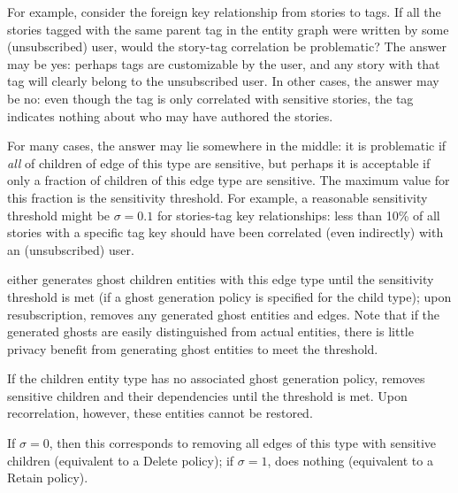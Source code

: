 \begin{itemize}
        For example, consider the foreign key relationship from stories to tags. If all
        the stories tagged with the same parent tag in the entity graph were written by some
        (unsubscribed) user, would the story-tag correlation be problematic? The answer may be yes: 
        perhaps tags are customizable by the user, and any story with that tag will clearly
        belong to the unsubscribed user. In other cases, the answer may be no: even though the tag is only
        correlated with sensitive stories, the tag indicates nothing about who may have authored the stories.

        For many cases, the answer may lie somewhere in the middle: it is problematic if \emph{all} of
        children of edge of this type are sensitive, but perhaps it is acceptable if only a fraction of
        children of this edge type are sensitive. The maximum value for this fraction is the sensitivity threshold.
        For example, a reasonable sensitivity threshold might be $\sigma = 0.1$ for stories-tag key relationships:
        less than 10\% of all stories with a specific tag key should have been correlated (even
        indirectly) with an (unsubscribed) user. 

        \sys{} either generates ghost children entities with this edge type until the
        sensitivity threshold is met (if a ghost generation policy is specified for the child type); upon
        resubscription, \sys{} removes any generated ghost entities and edges.
        Note that if the generated ghosts are easily distinguished from actual entities, there is
        little privacy benefit from generating ghost entities to meet the threshold.

        If the children entity type has no associated ghost generation policy, \sys{} removes
        sensitive children and their dependencies until the threshold is met.  Upon recorrelation,
        however, these entities cannot be restored.

        If $\sigma = 0$, then this corresponds to removing all edges of this type
        with sensitive children (equivalent to a Delete policy); if $\sigma = 1$, \sys{} does
        nothing (equivalent to a Retain policy).
    \end{itemize}

